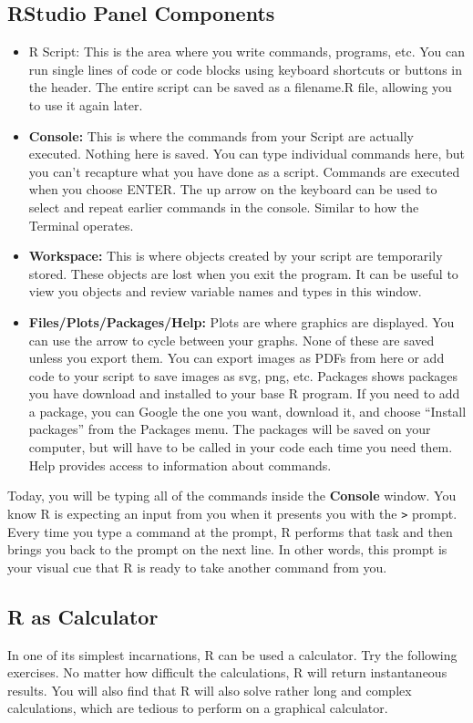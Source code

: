 \documentclass[11pt,twosided]{article}
\begin{document}
\subsection{RStudio Panel Components}
\begin{itemize}
\item {R Script:} This is the area where you write commands, programs, etc. You can run single lines of
code or code blocks using keyboard shortcuts or buttons in the header. The entire script can be
saved as a filename.R file, allowing you to use it again later.


\item {\bf Console:} This is where the commands from your Script are actually executed. Nothing here is
saved. You can type individual commands here, but you can’t recapture what you have done as a
script. Commands are executed when you choose ENTER. The up arrow on the keyboard can be
used to select and repeat earlier commands in the console. Similar to how the Terminal operates.

\item {\bf Workspace:} This is where objects created by your script are temporarily stored. These objects are
lost when you exit the program. It can be useful to view you objects and review variable names and
types in this window.

\item {\bf Files/Plots/Packages/Help:} Plots are where graphics are displayed. You can use the arrow to
cycle between your graphs. None of these are saved unless you export them. You can export images
as PDFs from here or add code to your script to save images as svg, png, etc. Packages shows
packages you have download and installed to your base R program. If you need to add a package,
you can Google the one you want, download it, and choose “Install packages” from the Packages
menu. The packages will be saved on your computer, but will have to be called in your code each
time you need them. Help provides access to information about commands.
\end{itemize}


Today, you will be typing all of the commands inside the {\bf Console} window.  You know R is expecting an input from you when it presents you with the {\tt >} prompt.  Every time you type a command at the prompt, R performs that task and then brings you back to the prompt on the next line.  In other words, this prompt is your visual cue that R is ready to take another command from you.

\subsection{R as Calculator}
In one of its simplest incarnations, R can be used a calculator.  Try the following exercises.  No matter how difficult the calculations, R will return instantaneous results.  You will also find that R will also solve rather long and complex calculations, which are tedious to perform on a graphical calculator.\\
\end{document}
